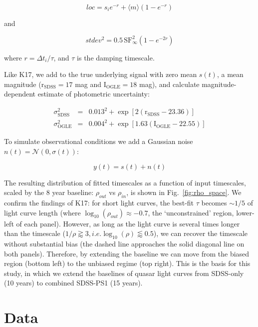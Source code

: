 \documentclass[twocolumn]{aastex62}
\begin{document}
\begin{equation}
loc = s_{i} e ^ { - r  }  + \langle m \rangle \left( 1 - e ^{ - r }\right)
\end{equation}

and 

\begin{equation}
stdev^{2} =  0.5  \, \mathrm{SF}_{\infty}^{2} \left( 1 - e ^{  - 2 r  }  \right)
\end{equation}

where  $r = \Delta t_{i} / \tau$, and $\tau$ is the damping timescale.


Like K17, we add to the true underlying signal with zero mean $s(t)$, a mean magnitude  ($\mathrm{r_{SDSS}}=17$ mag and $\mathrm{I_{OGLE}}=18$ mag), and calculate magnitude-dependent estimate of photometric uncertainty:

\begin{eqnarray}
\sigma_{\mathrm{SDSS}}^{2} &=& 0.013^{2} + \exp{[2 (\mathrm{r_{SDSS}}-23.36)]} \\
\sigma_{\mathrm{OGLE}}^{2} &=& 0.004^{2} + \exp{[1.63 (\mathrm{I_{OGLE}} - 22.55)]}
\end{eqnarray}

To simulate observational conditions  we add a Gaussian noise $n(t) = \mathcal{N}(0,\sigma(t))$:

\begin{equation}
y(t) = s(t) + n(t) 
\end{equation}

The resulting distribution of fitted timescales  as a function of input timescales, scaled by the  8 year baseline: $\rho_{out}$ vs $\rho_{in}$, is shown in Fig.~\ref{fig:rho_space}. We confirm the findings of K17: for short light curves, the best-fit $\tau$ becomes $\sim 1/5$ of light curve length (where $\log_{10}{(\rho_{out})} \approx -0.7$, the `unconstrained' region, lower-left of each panel). However, as long as the light curve is several times longer than the timescale ($1/\rho \gtrapprox 3, i.e. \log_{10}{(\rho)} \lessapprox 0.5$), we can recover the timescale without substantial bias (the dashed line approaches the solid diagonal line on both panels). Therefore, by extending the baseline we can move from the biased region (bottom left) to the unbiased regime (top right). This is the basis for this study,  in which we extend the baselines of quasar light curves from SDSS-only (10 years) to combined SDSS-PS1 (15 years). 


%
%
%
%
\section{Data}
\label{sec:data}
\end{document}
